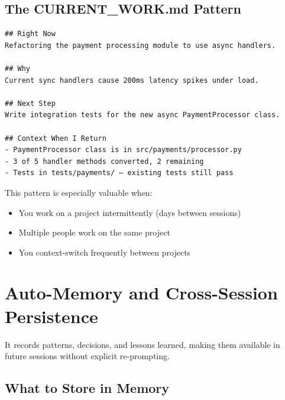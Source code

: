 \subsection{The CURRENT\_WORK.md Pattern}


\begin{verbatim}
## Right Now
Refactoring the payment processing module to use async handlers.

## Why
Current sync handlers cause 200ms latency spikes under load.

## Next Step
Write integration tests for the new async PaymentProcessor class.

## Context When I Return
- PaymentProcessor class is in src/payments/processor.py
- 3 of 5 handler methods converted, 2 remaining
- Tests in tests/payments/ — existing tests still pass
\end{verbatim}


This pattern is especially valuable when:
\begin{itemize}
  \item You work on a project intermittently (days between sessions)
  \item Multiple people work on the same project
  \item You context-switch frequently between projects
\end{itemize}

\section{Auto-Memory and Cross-Session Persistence}
\label{sec:memory}


It records patterns, decisions, and lessons learned, making them available
in future sessions without explicit re-prompting.

\subsection{What to Store in Memory}

